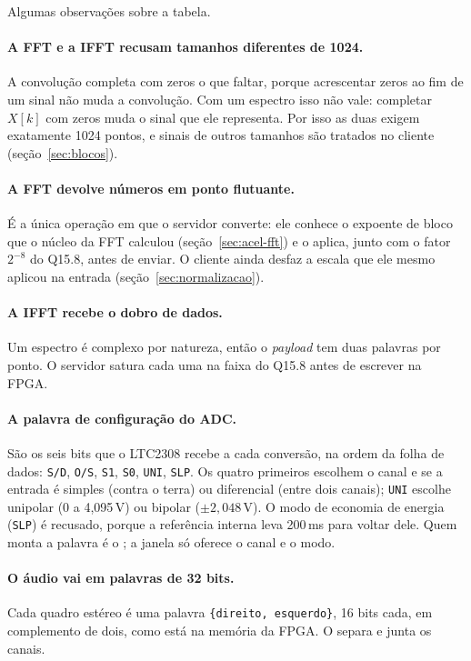 Algumas observações sobre a tabela.

\paragraph{A FFT e a IFFT recusam tamanhos diferentes de 1024.} A convolução
completa com zeros o que faltar, porque acrescentar zeros ao fim de um sinal
não muda a convolução. Com um espectro isso não vale: completar \(X[k]\) com
zeros muda o sinal que ele representa. Por isso as duas exigem exatamente 1024
pontos, e sinais de outros tamanhos são tratados no cliente
(seção~\ref{sec:blocos}).

\paragraph{A FFT devolve números em ponto flutuante.} É a única operação em que
o servidor converte: ele conhece o expoente de bloco que o núcleo da FFT
calculou (seção~\ref{sec:acel-fft}) e o aplica, junto com o fator \(2^{-8}\) do
Q15.8, antes de enviar. O cliente ainda desfaz a escala que ele mesmo aplicou
na entrada (seção~\ref{sec:normalizacao}).

\paragraph{A IFFT recebe o dobro de dados.} Um espectro é complexo por
natureza, então o \emph{payload} tem duas palavras por ponto. O servidor satura
cada uma na faixa do Q15.8 antes de escrever na FPGA.

\paragraph{A palavra de configuração do ADC.} São os seis bits que o LTC2308
recebe a cada conversão, na ordem da folha de dados:
\texttt{S/D}, \texttt{O/S}, \texttt{S1}, \texttt{S0}, \texttt{UNI},
\texttt{SLP}. Os quatro primeiros escolhem o canal e se a entrada é simples
(contra o terra) ou diferencial (entre dois canais); \texttt{UNI} escolhe
unipolar (0 a 4,095\,V) ou bipolar (\(\pm 2{,}048\)\,V). O modo de
economia de energia (\texttt{SLP}) é recusado, porque a referência interna leva
200\,ms para voltar dele. Quem monta a palavra é o ; a
janela só oferece o canal e o modo.

\paragraph{O áudio vai em palavras de 32 bits.} Cada quadro estéreo é uma
palavra \texttt{\{direito, esquerdo\}}, 16 bits cada, em complemento de dois,
como está na memória da FPGA. O  separa e junta os canais.

